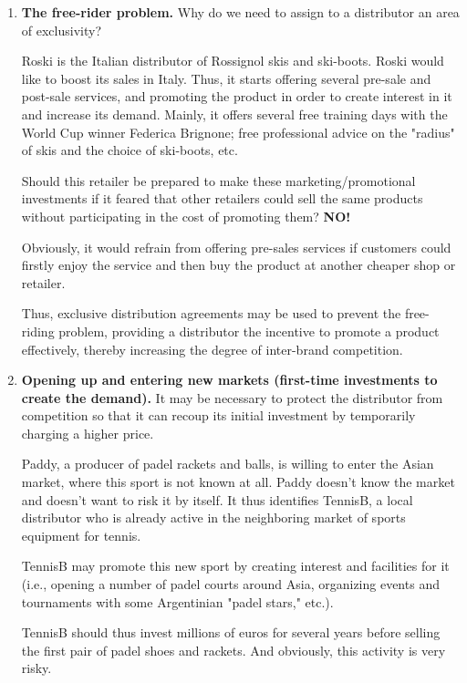         \begin{enumerate}[label=(\alph*)]
            \item \textbf{The free-rider problem.} Why do we need to assign to a distributor an area of exclusivity?
        
            Roski is the Italian distributor of Rossignol skis and ski-boots. Roski would like to boost its sales in Italy. Thus, it starts offering several pre-sale and post-sale services, and promoting the product in order to create interest in it and increase its demand. Mainly, it offers several free training days with the World Cup winner Federica Brignone; free professional advice on the "radius" of skis and the choice of ski-boots, etc.
        
            Should this retailer be prepared to make these marketing/promotional investments if it feared that other retailers could sell the same products without participating in the cost of promoting them? \textbf{NO!}
        
            Obviously, it would refrain from offering pre-sales services if customers could firstly enjoy the service and then buy the product at another cheaper shop or retailer.
        
            Thus, exclusive distribution agreements may be used to prevent the free-riding problem, providing a distributor the incentive to promote a product effectively, thereby increasing the degree of inter-brand competition.
        
            \item \textbf{Opening up and entering new markets (first-time investments to create the demand).} It may be necessary to protect the distributor from competition so that it can recoup its initial investment by temporarily charging a higher price.
        
            Paddy, a producer of padel rackets and balls, is willing to enter the Asian market, where this sport is not known at all. Paddy doesn’t know the market and doesn’t want to risk it by itself. It thus identifies TennisB, a local distributor who is already active in the neighboring market of sports equipment for tennis.
        
            TennisB may promote this new sport by creating interest and facilities for it (i.e., opening a number of padel courts around Asia, organizing events and tournaments with some Argentinian "padel stars," etc.).
        
            TennisB should thus invest millions of euros for several years before selling the first pair of padel shoes and rackets. And obviously, this activity is very risky.
        

\end{enumerate}
